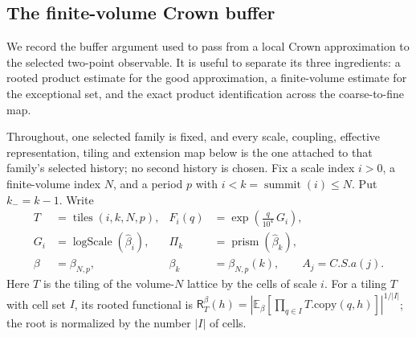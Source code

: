 \subsection{The finite-volume Crown buffer}
\label{sec:ex-lattice-trace-crown-buffer}

We record the buffer argument used to pass from a local Crown approximation to
the selected two-point observable. It is useful to separate its three
ingredients: a rooted product estimate for the good approximation, a
finite-volume estimate for the exceptional set, and the exact product
identification across the coarse-to-fine map.

Throughout, one selected family is fixed, and every scale, coupling,
effective representation, tiling and extension map below is the one
attached to that family's selected history; no second history is chosen.
Fix a scale index $i>0$, a finite-volume index $N$, and a period $p$ with
$i<k=\operatorname{summit}(i)\le N$. Put $k_-=k-1$. Write
\begin{align*}
 T&=\operatorname{tiles}(i,k,N,p),&
 F_i(q)&=\exp\!\left(\frac{q}{10^4}\,G_i\right),\\
 G_i&=\operatorname{logScale}(\widehat\beta_i),&
 \Pi_k&=\operatorname{prism}(\widehat\beta_k),\\
 \beta&=\beta_{N,p},& \beta_k&=\beta_{N,p}(k),\qquad A_j=C.S.a(j).
\end{align*}
Here $T$ is the tiling of the volume-$N$ lattice by the cells of scale
$i$. For a tiling $T$ with cell set $I$, its rooted functional is
$\mathsf R_T^\beta(h)=|\mathbb E_\beta[\prod_{q\in I}T.\mathrm{copy}(q,h)]|^{1/|I|}$;
the root is normalized by the number $|I|$ of cells.

